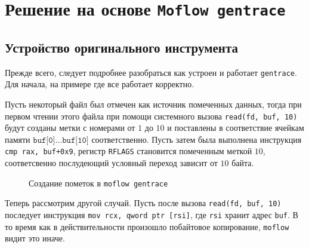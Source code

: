 \chapter{Решение на основе \texttt{Moflow gentrace}}

\section{Устройство оригинального инструмента}

Прежде всего, следует подробнее разобраться как устроен и работает \texttt{gentrace}. Для начала, на примере где все работает корректно.

Пусть некоторый файл был отмечен как источник помеченных данных, тогда при первом чтении этого файла при помощи системного вызова \texttt{read(fd, buf, 10)} будут созданы метки с номерами от $1$ до $10$ и поставлены в соответствие ячейкам памяти $\texttt{buf[0]}\ldots \texttt{buf[10]}$ соответственно. Пусть затем была выполнена инструкция \texttt{cmp rax, buf+0x9}, регистр \texttt{RFLAGS} становится помеченным меткой $10$, соответсвенно послудеющий условный переход зависит от $10$ байта.


\begin{figure}[H]
    \caption{Создание пометок в \texttt{moflow gentrace}}
    \label{fig:moflow1}
\end{figure}

Теперь рассмотрим другой случай. Пусть после вызова \texttt{read(fd, buf, 10)} последует инструкция \texttt{mov rcx, qword ptr [rsi]}, где \texttt{rsi} хранит адрес \texttt{buf}. В то время как в действительности произошло побайтовое копирование, \texttt{moflow} видит это иначе.

